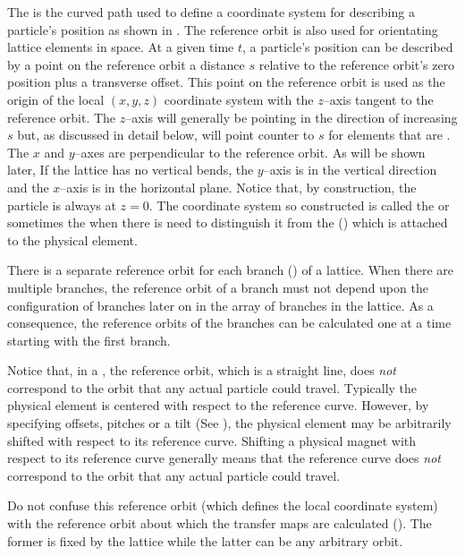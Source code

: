 The  is the curved path used to define a
coordinate system for describing a particle's position as shown in
. The reference orbit is also used for orientating
lattice elements in space. At a given time $t$, a particle's position
can be described by a point on the reference orbit a distance $s$
relative to the reference orbit's zero position plus a transverse
offset. This point on the reference orbit is used as the origin of the
local $(x, y, z)$ coordinate system with the $z$--axis tangent to the
reference orbit. The $z$--axis will generally be pointing in the
direction of increasing $s$ but, as discussed in detail below, will
point counter to $s$ for elements that are . The $x$ and
$y$--axes are perpendicular to the reference orbit. As will be shown
later, If the lattice has no vertical bends, the $y$--axis is in the
vertical direction and the $x$--axis is in the horizontal
plane. Notice that, by construction, the particle is always at $z =
0$. The coordinate system so constructed is called the  or sometimes the  when there is need to distinguish it from the  () which is attached to
the physical element.

There is a separate reference orbit for each branch
() of a lattice. When there are multiple branches,
the reference orbit of a branch must not depend upon the configuration
of branches later on in the array of branches in the lattice. As a
consequence, the reference orbits of the branches can be calculated
one at a time starting with the first branch.

Notice that, in a , the reference orbit, which is a
straight line, does {\em not} correspond to the orbit that any actual
particle could travel. Typically the physical element is
centered with respect to the reference curve. However, by specifying offsets, 
pitches or a tilt (See ), the physical element may be
arbitrarily shifted with respect to its reference curve. Shifting a
physical magnet with respect to its reference curve generally means
that the reference curve does {\em not} correspond to the orbit that
any actual particle could travel.

Do not confuse this reference orbit (which defines the local
coordinate system) with the reference orbit about which the transfer
maps are calculated (). The former is fixed by the
lattice while the latter can be any arbitrary orbit.

